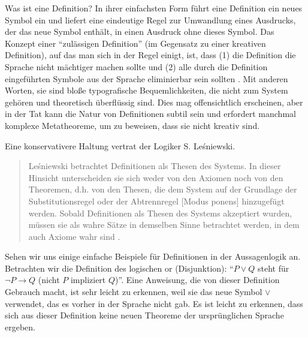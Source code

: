 Was ist eine Definition?  In ihrer einfachsten Form führt eine Definition ein neues Symbol ein und liefert eine eindeutige Regel zur Umwandlung eines Ausdrucks, der das neue Symbol enthält, in einen Ausdruck ohne dieses Symbol.  Das Konzept einer "`zulässigen Definition"' (im Gegensatz zu einer kreativen Definition), auf das man sich in der Regel einigt, ist, dass (1) die Definition die Sprache nicht mächtiger machen sollte und (2) alle durch die Definition eingeführten Symbole aus der Sprache eliminierbar sein sollten \cite{Nemesszeghy}.  Mit anderen Worten, sie sind bloße typografische Bequemlichkeiten, die nicht zum System gehören und theoretisch überflüssig sind.  Dies mag offensichtlich erscheinen, aber in der Tat kann die Natur von Definitionen subtil sein und erfordert manchmal komplexe Metatheoreme, um zu beweisen, dass sie nicht kreativ sind. 

Eine konservativere Haltung vertrat der Logiker S. Le\'{s}niewski. 
\begin{quote}
  Le\'{s}niewski betrachtet Definitionen als Thesen des Systems.  In dieser Hinsicht unterscheiden sie sich weder von den Axiomen noch von den Theoremen, d.h. von den Thesen, die dem System auf der Grundlage der Substitutionsregel oder der Abtrennregel [Modus ponens] hinzugefügt werden.  Sobald Definitionen als Thesen des Systems akzeptiert wurden, müssen sie als wahre Sätze in demselben Sinne betrachtet werden, in dem auch Axiome wahr sind
  \cite{Lejewski}.
\end{quote} 

Sehen wir uns einige einfache Beispiele für Definitionen in der Aussagenlogik an.  Betrachten wir die Definition des logischen {\sc or} (Disjunktion): "`$P\vee Q$ steht für $\neg P \rightarrow Q$ (nicht $P$ impliziert $Q$)"'.  Eine Anweisung, die von dieser Definition Gebrauch macht, ist sehr leicht zu erkennen, weil sie das neue Symbol $\vee$ verwendet, das es vorher in der Sprache nicht gab.  Es ist leicht zu erkennen, dass sich aus dieser Definition keine neuen Theoreme der ursprünglichen Sprache ergeben. 

